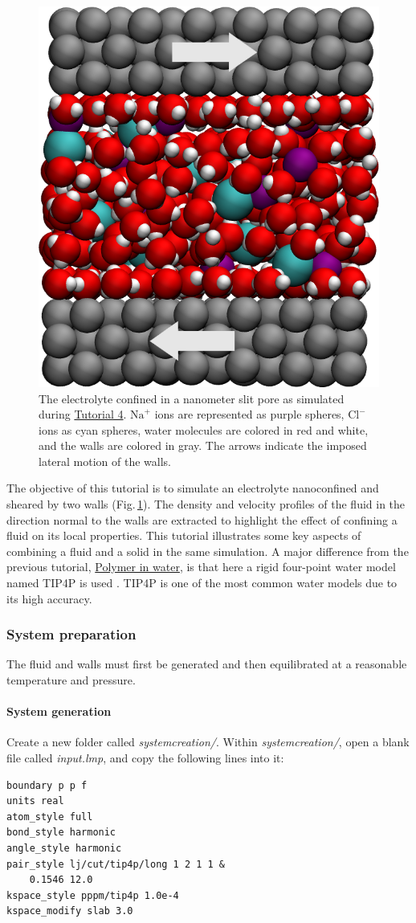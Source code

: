 \documentclass[9pt,tutorial]{livecoms}
\begin{document}
\begin{figure}
\centering
\includegraphics[width=0.55\linewidth]{NANOSHEAR}
\caption{The electrolyte confined in a nanometer slit pore as simulated during
\hyperref[sheared-confined-label]{Tutorial 4}. $\text{Na}^+$ ions are represented
as purple spheres, $\text{Cl}^-$ ions as cyan spheres, water molecules are colored
in red and white, and the walls are colored in gray. The arrows indicate the
imposed lateral motion of the walls.}
\label{fig:NANOSHEAR}
\end{figure}

\noindent The objective of this tutorial is to simulate an electrolyte
nanoconfined and sheared by two walls (Fig.\,\ref{fig:NANOSHEAR}). The density
and velocity profiles of the fluid in the direction normal to the walls are
extracted to highlight the effect of confining a fluid on its local properties.
This tutorial illustrates some key aspects of combining a fluid and a solid in
the same simulation. A major difference from the previous tutorial,
\hyperref[all-atoms-label]{Polymer in water}, is that here a rigid four-point
water model named TIP4P is used \cite{abascal2005general}. TIP4P is one of
the most common water models due to its high accuracy.

\subsubsection{System preparation}
The fluid and walls must first be generated and then equilibrated at a reasonable
temperature and pressure.

\paragraph{System generation}
Create a new folder called \textit{systemcreation/}. Within
\textit{systemcreation/}, open a blank file called \textit{input.lmp}, and
copy the following lines into it:
{\normalsize \begin{verbatim}
boundary p p f
units real
atom_style full
bond_style harmonic
angle_style harmonic
pair_style lj/cut/tip4p/long 1 2 1 1 &
    0.1546 12.0
kspace_style pppm/tip4p 1.0e-4
kspace_modify slab 3.0
\end{verbatim}}
\end{document}

